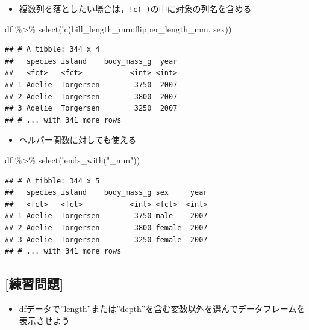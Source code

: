 \documentclass[
  xelatex,ja=standard, b5paper]{bxjsbook}
\newenvironment{Shaded}{\begin{snugshade}}{\end{snugshade}}
\newcommand{\FunctionTok}[1]{\textcolor[rgb]{0.00,0.00,0.00}{#1}}
\newcommand{\NormalTok}[1]{#1}
\newcommand{\SpecialCharTok}[1]{\textcolor[rgb]{0.00,0.00,0.00}{#1}}
\newcommand{\StringTok}[1]{\textcolor[rgb]{0.31,0.60,0.02}{#1}}
\providecommand{\tightlist}{%
  \setlength{\itemsep}{0pt}\setlength{\parskip}{0pt}}
\begin{document}
\begin{itemize}
\tightlist
\item
  複数列を落としたい場合は，\texttt{!c(\ )}の中に対象の列名を含める
\end{itemize}

\begin{Shaded}
\begin{Highlighting}[]
\NormalTok{df }\SpecialCharTok{\%\textgreater{}\%} 
  \FunctionTok{select}\NormalTok{(}\SpecialCharTok{!}\FunctionTok{c}\NormalTok{(bill\_length\_mm}\SpecialCharTok{:}\NormalTok{flipper\_length\_mm, sex))}
\end{Highlighting}
\end{Shaded}

\begin{verbatim}
## # A tibble: 344 x 4
##   species island    body_mass_g  year
##   <fct>   <fct>           <int> <int>
## 1 Adelie  Torgersen        3750  2007
## 2 Adelie  Torgersen        3800  2007
## 3 Adelie  Torgersen        3250  2007
## # ... with 341 more rows
\end{verbatim}

\begin{itemize}
\tightlist
\item
  ヘルパー関数に対しても使える
\end{itemize}

\begin{Shaded}
\begin{Highlighting}[]
\NormalTok{df }\SpecialCharTok{\%\textgreater{}\%} 
  \FunctionTok{select}\NormalTok{(}\SpecialCharTok{!}\FunctionTok{ends\_with}\NormalTok{(}\StringTok{"\_mm"}\NormalTok{))}
\end{Highlighting}
\end{Shaded}

\begin{verbatim}
## # A tibble: 344 x 5
##   species island    body_mass_g sex     year
##   <fct>   <fct>           <int> <fct>  <int>
## 1 Adelie  Torgersen        3750 male    2007
## 2 Adelie  Torgersen        3800 female  2007
## 3 Adelie  Torgersen        3250 female  2007
## # ... with 341 more rows
\end{verbatim}

\hypertarget{ux7df4ux7fd2ux554fux984c-2}{%
\subsection{{[}練習問題{]}}\label{ux7df4ux7fd2ux554fux984c-2}}

\begin{itemize}
\tightlist
\item
  dfデータで''length''または''depth''を含む変数以外を選んでデータフレームを表示させよう
\end{itemize}
\end{document}
